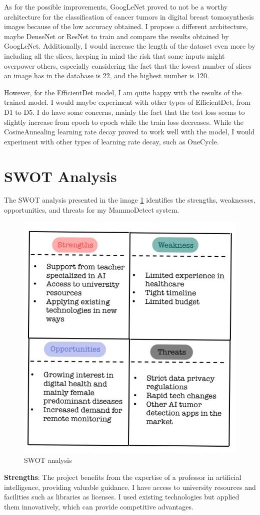 As for the possible improvements, GoogLeNet proved to not be a worthy architecture for the classification of cancer tumors in digital breast tomosynthesis images because of the low accuracy obtained. I propose a different architecture, maybe DenseNet or ResNet to train and compare the results obtained by GoogLeNet. Additionally, I would increase the length of the dataset even more by including all the slices, keeping in mind the risk that some inputs might overpower others, especially considering the fact that the lowest number of slices an image has in the database is 22, and the highest number is 120.

However, for the EfficientDet model, I am quite happy with the results of the trained model. I would maybe experiment with other types of EfficientDet, from D1 to D5. I do have some concerns, mainly the fact that the test loss seems to slightly increase from epoch to epoch while the train loss decreases. While the CosineAnnealing learning rate decay proved to work well with the model, I would experiment with other types of learning rate decay, such as OneCycle.

\section{SWOT Analysis}

The SWOT analysis presented in the image \ref{fig:fig44} identifies the strengths, weaknesses, opportunities, and threats for my MammoDetect system.

\begin{figure}[H]
    \centering
    \includegraphics[width=0.5\linewidth]{figures/Figure54.png}
    \caption{SWOT analysis}
    \label{fig:fig44}
\end{figure}

\textbf{Strengths}:
The project benefits from the expertise of a professor in artificial intelligence, providing valuable guidance. I have access to university resources and facilities such as libraries as licenses. I used existing technologies but applied them innovatively, which can provide competitive advantages.

